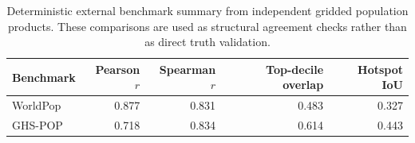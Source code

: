 \begin{table}[H]
\centering
\caption{Deterministic external benchmark summary from independent gridded population products. These comparisons are used as structural agreement checks rather than as direct truth validation.}
\label{tab:external-benchmark-unified}
\begin{tabular}{lrrrr}
\toprule
Benchmark & Pearson $r$ & Spearman $r$ & Top-decile overlap & Hotspot IoU \\
\midrule
WorldPop & 0.877 & 0.831 & 0.483 & 0.327 \\
GHS-POP & 0.718 & 0.834 & 0.614 & 0.443 \\
\bottomrule
\end{tabular}
\end{table}

